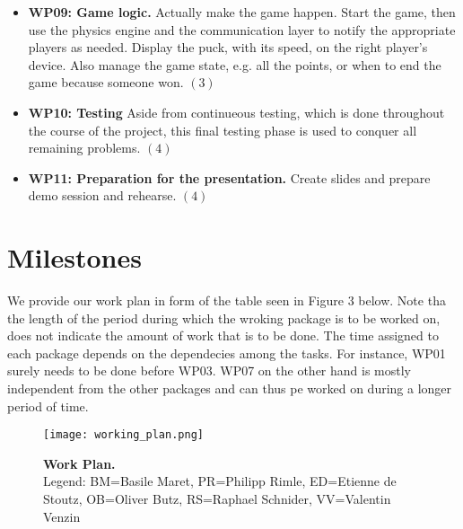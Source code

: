 \documentclass{report}
\begin{document}
\begin{itemize}
	\item {\bf WP09: Game logic.} Actually make the game happen. Start the game, then use the physics engine and the communication layer to notify the appropriate players as needed. Display the puck, with its speed, on the right player's device. Also manage the game state, e.g. all the points, or when to end the game because someone won. $(3)$

         \item {\bf WP10:  Testing} Aside from continueous testing, which is done throughout the course of the project, this final testing phase is used to conquer all remaining problems. $(4)$
         
         \item {\bf WP11: Preparation for the presentation.} Create slides and prepare demo session and rehearse. $(4)$
         
\end{itemize}
 
\section{Milestones}
We provide our work plan in form of the table seen in Figure 3 below. Note tha the length of the period during which the wroking package is to be worked on, does not indicate the amount of work that is to be done. The time assigned to each package depends on the dependecies among the tasks. For instance, WP01 surely needs to be done before WP03. WP07 on the other hand is mostly independent from the other packages and can thus pe worked on during a longer period of time. 

\begin{landscape}
 \begin{figure}
  \centering
  \texttt{[image: working\_plan.png]}
  \caption{\textbf{Work Plan.} \\ \textmd{Legend: BM=Basile Maret, PR=Philipp Rimle, ED=Etienne de Stoutz, OB=Oliver Butz, RS=Raphael Schnider, VV=Valentin Venzin}}
 \end{figure}
\end{landscape}





\end{document}
